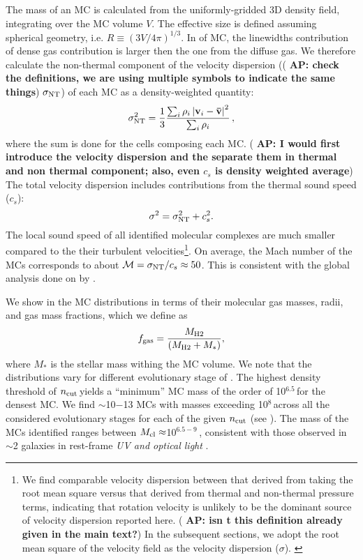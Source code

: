 \IfFileExists{emulateapjlegacy.cls}{\documentclass[iop]{emulateapjlegacy}}{\documentclass[iop]{emulateapj}}
\newcommand{\AP}[1]{({\bf \color{apcolor} AP: #1})}
\begin{document}
The mass of an MC is calculated from the uniformly-gridded 3D density field, integrating over the MC volume $V$. The effective size is defined assuming spherical geometry, i.e. $R \equiv (3 V /4 \pi)^{1/3}$.
%
In \obs of MC, the linewidths contribution of dense gas contribution is larger then the one from the diffuse gas. We therefore calculate the non-thermal component of the velocity dispersion (\AP{check the definitions, we are using multiple symbols to indicate the same things} $\sigma_{\rm NT}$) of each MC as a density-weighted quantity:
\begin{equation}
\sigma_{\rm NT}^2 = \frac{1}{{3}}\frac{\sum_{i} \rho_i \left|\mathbf{v}_i - \mathbf{\bar v}\right|^2}{\sum_i \rho_i}\,,
\end{equation}
where the sum is done for the cells composing each MC. \AP{I would first introduce the velocity dispersion and the separate them in thermal and non thermal component; also, even $c_s$ is density weighted average} The total velocity dispersion includes contributions from the thermal sound speed ($c_s$):
\begin{equation}
\sigma^2 = \sigma_{\rm NT}^2 + c_s^2.
\end{equation}
The local sound speed of all identified molecular complexes are much smaller compared to the their turbulent velocities\footnote{We find comparable velocity dispersion between that derived from taking the root mean square versus that derived from thermal and non-thermal pressure terms, indicating that rotation velocity is unlikely to be the dominant source of velocity dispersion reported here. \AP{isn t this definition already given in the main text?} In the subsequent sections, we adopt the root mean square of the velocity field as the velocity dispersion ($\sigma$). \label{ftn:veldisp}}. On average, the Mach number of the MCs corresponds to about $\mathcal{M} = \sigma_{\rm NT}/c_s\approx 50$. This is consistent with the global analysis done on \flower by \citet{Vallini18a}.

We show in  the MC distributions in terms of their molecular gas masses, radii, and gas mass fractions, which we define as
\begin{equation}
f_{\rm gas} = \frac{M_{\rm H2}} {\left(M_{\rm H2} + M_*\right)},
\end{equation}
where $M_*$ is the stellar mass withing the MC volume.
%
We note that the distributions vary for different evolutionary stage of \flower. The highest density threshold of $n_{\rm cut}$\,\cc yields a ``minimum'' MC mass of the order of 10$^{6.5}$\,\Msun for the densest MC.
%
We find $\sim$10$-$13 MCs with masses exceeding 10$^8$\,\Msun across all the considered evolutionary stages for each of the given $n_{\rm cut}$ (see ). The mass of the MCs identified ranges between $M_{\rm cl}\approx$10$^{6.5-9}$\,\Msun, consistent with those observed in \z$\sim$2 galaxies in rest-frame {\it UV and optical light} \citep{Elmegreen07a, Elmegreen09a}.
\end{document}
